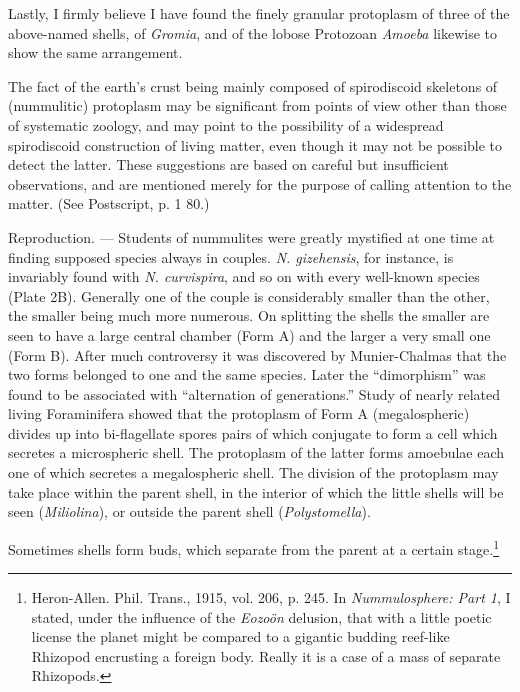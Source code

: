 \documentclass[a4paper, 12pt, oneside]{article}
\begin{document}
Lastly, I firmly believe I have found the finely granular protoplasm of three of the above-named shells, of \emph{Gromia}, and of the lobose Protozoan \emph{Amoeba} likewise to show the same arrangement.

The fact of the earth's crust being mainly composed of spirodiscoid skeletons of (nummulitic) protoplasm may be significant from points of view other than those of systematic zoology, and may point to the possibility of a widespread spirodiscoid construction of living matter, even though it may not be possible to detect the latter. These suggestions are based on careful but insufficient observations, and are mentioned merely for the purpose of calling attention to the matter. (See Postscript, p. 1 80.)

Reproduction. --- Students of nummulites were greatly mystified at one time at finding supposed species always in couples. \emph{N. gizehensis}, for instance, is invariably found with \emph{N. curvispira}, and so on with every well-known species (Plate 2B). Generally one of the couple is considerably smaller than the other, the smaller being much more numerous. On splitting the shells the smaller are seen to have a large central chamber (Form A) and the larger a very small one (Form B). After much controversy it was discovered by Munier-Chalmas that the two forms belonged to one and the same species. Later the ``dimorphism'' was found to be associated with ``alternation of generations.'' Study of nearly related living Foraminifera showed that the protoplasm of Form A (megalospheric) divides up into bi-flagellate spores pairs of which conjugate to form a cell which secretes a microspheric shell. The protoplasm of the latter forms amoebulae each one of which secretes a megalospheric shell. The division of the protoplasm may take place within the parent shell, in the interior of which the little shells will be seen (\emph{Miliolina}), or outside the parent shell (\emph{Polystomella}).

Sometimes shells form buds, which separate from the parent at a certain stage.\footnote{Heron-Allen. Phil. Trans., 1915, vol. 206, p. 245. In \emph{Nummulosphere: Part 1}, I stated, under the influence of the \emph{Eozoön} delusion, that with a little poetic license the planet might be compared to a gigantic budding reef-like Rhizopod encrusting a foreign body. Really it is a case of a mass of separate Rhizopods.}
\end{document}
